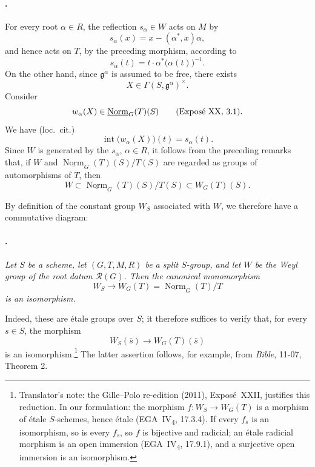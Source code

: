 \paragraph{.}
For every root \(\alpha\in R\), the reflection \(s_\alpha\in W\)
acts on \(M\) by
\[
  s_\alpha(x)=x-(\alpha^*,x)\alpha,
\]
and hence acts on \(T\), by the preceding morphism, according to
\[
  s_\alpha(t)=t\cdot\alpha^*\bigl(\alpha(t)\bigr)^{-1}.
\]
On the other hand, since \(\mathfrak g^\alpha\) is assumed to be
free, there exists
\[
  X\in\Gamma(S,\mathfrak g^\alpha)^\times.
\]
Consider
\[
  w_\alpha(X)\in
  \underline{\operatorname{Norm}}_G(T)(S)
  \qquad\textup{(Exposé XX, 3.1)}.
\]
We have \textup{(loc.\ cit.)}
\[
  \operatorname{int}\bigl(w_\alpha(X)\bigr)(t)=s_\alpha(t).
\]
Since \(W\) is generated by the \(s_\alpha\), \(\alpha\in R\), it
follows from the preceding remarks that, if \(W\) and
\(\underline{\operatorname{Norm}}_G(T)(S)/T(S)\) are regarded as
groups of automorphisms of \(T\), then
\[
  W
  \subset
  \underline{\operatorname{Norm}}_G(T)(S)/T(S)
  \subset
  W_G(T)(S).
\]

By definition of the constant group \(W_S\) associated with \(W\),
we therefore have a commutative
diagram:

\begin{center}
  
\end{center}

\paragraph{.}
\textit{Let \(S\) be a scheme, let \((G,T,M,R)\) be a split
\(S\)-group, and let \(W\) be the Weyl group of the root datum
\(\mathcal R(G)\). Then the canonical monomorphism}
\[
  W_S\longrightarrow
  W_G(T)=\underline{\operatorname{Norm}}_G(T)/T
\]
\textit{is an isomorphism.}

Indeed, these are étale groups over \(S\); it therefore suffices to
verify that, for every \(s\in S\), the morphism
\[
  W_S(\bar s)\longrightarrow W_G(T)(\bar s)
\]
is an isomorphism.\footnote{Translator's note: the Gille--Polo re-edition (2011), Exposé~XXII, justifies this
reduction. In our formulation: the morphism \(f\colon W_S\to W_G(T)\) is a
morphism of étale \(S\)-schemes, hence étale (EGA~IV\textsubscript{4},
17.3.4). If every \(f_{\bar s}\) is an isomorphism, so is every \(f_s\), so
\(f\) is bijective and radicial; an étale radicial morphism is an open
immersion (EGA~IV\textsubscript{4}, 17.9.1), and a surjective open immersion
is an isomorphism.}
The latter assertion follows, for example, from \emph{Bible},
11-07, Theorem 2.


